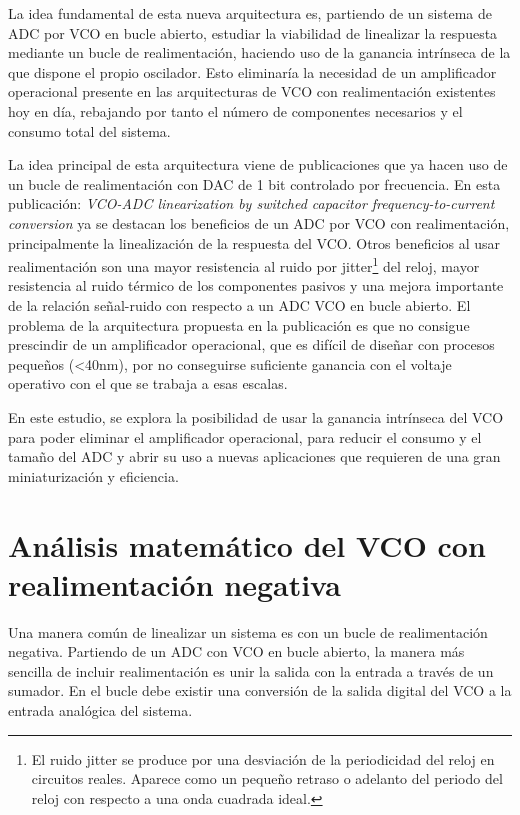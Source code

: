 \documentclass[12pt]{report} %
\begin{document}
	La idea fundamental de esta nueva arquitectura es, partiendo de un sistema de ADC por VCO en bucle abierto, estudiar la viabilidad de linealizar la respuesta mediante un bucle de realimentación, haciendo uso de la ganancia intrínseca de la que dispone el propio oscilador. Esto eliminaría la necesidad de un amplificador operacional presente en las arquitecturas de VCO con realimentación existentes hoy en día, rebajando por tanto el número de componentes necesarios y el consumo total del sistema.
	
	La idea principal de esta arquitectura viene de publicaciones que ya hacen uso de un bucle de realimentación con DAC de 1 bit controlado por frecuencia. En esta publicación: \textit{VCO-ADC linearization by switched capacitor frequency-to-current conversion}\cite{vco-adc-ruben-eric} ya se destacan los beneficios de un ADC por VCO con realimentación, principalmente la linealización de la respuesta del VCO. Otros beneficios al usar realimentación son una mayor resistencia al ruido por jitter\footnote{El ruido jitter se produce por una desviación de la periodicidad del reloj en circuitos reales. Aparece como un pequeño retraso o adelanto del periodo del reloj con respecto a una onda cuadrada ideal.}  del reloj, mayor resistencia al ruido térmico de los componentes pasivos y una mejora importante de la relación señal-ruido con respecto a un ADC VCO en bucle abierto. El problema de la arquitectura propuesta en la publicación es que no consigue prescindir de un amplificador operacional, que es difícil de diseñar con procesos pequeños (<40nm), por no conseguirse suficiente ganancia con el voltaje operativo con el que se trabaja a esas escalas.
	
	En este estudio, se explora la posibilidad de usar la ganancia intrínseca del VCO para poder eliminar el amplificador operacional, para reducir el consumo y el tamaño del ADC y abrir su uso a nuevas aplicaciones que requieren de una gran miniaturización y eficiencia.
	
	
	\section{Análisis matemático del VCO con realimentación negativa}
	
	Una manera común de linealizar un sistema es con un bucle de realimentación negativa. Partiendo de un ADC con VCO en bucle abierto, la manera más sencilla de incluir realimentación es unir la salida con la entrada a través de un sumador. En el bucle debe existir una conversión de la salida digital del VCO a la entrada analógica del sistema.
\end{document}
